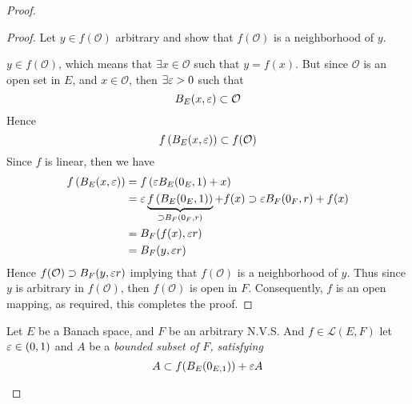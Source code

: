 \begin{proof}
\begin{proof}
Let $y \in  f (\mathcal{O} )  $  arbitrary and show that 
$f(\mathcal{O} )  $  is a neighborhood of $y $.

$y \in  f ( \mathcal{O} )  $, which means that 
$\exists x \in  \mathcal{O}  $  such that 
$y = f(x)  $. But since $\mathcal{O}  $  is an open set in 
$E $, and $x \in  \mathcal{O}  $, then $\exists  \varepsilon  > 0 $  such that 
\[
B_{E}(x, \varepsilon )  \subset  \mathcal{O} 
\]
Hence 
\[
f \left( B_{E}(x, \varepsilon )  \right) \subset  f(\mathcal{O} ) 
\]
Since $f $ is linear, then we have 
\begin{align*}
	f \left( B_{E}(x, \varepsilon )  \right) &= 
f \left( \varepsilon B_{E}(0_{E}, 1) +  x \right) \\
					   &= 
					   \varepsilon  
					   \underbrace{
		f \left( B_{E}(0_{E},1)  \right) 
					   }_{ \supset B_{F}(0_{F}, r) }  + f(x) 
					   \supset  \varepsilon 
					   B_{F}(0_{F}, r)  + 
					   f(x) 
					   \\
					   &= 
					   B_{F}(f(x), \varepsilon r )  \\
					   &= 
					   B_{F}(y, \varepsilon  r) 
\end{align*}
Hence $f(\mathcal{O} ) \supset B_{F}(y, \varepsilon  r)  $ implying that 
$f(\mathcal{O} )  $  is a neighborhood of $y $. 
Thus since $y $ is arbitrary in $f(\mathcal{O} )  $, then 
$f(\mathcal{O} )  $ is open in $F $. Consequently, 
$f $ is an open mapping, as required, this completes the proof.
\end{proof}             
\begin{theorem}[]
Let $E $ be a Banach space, and $F $ be an arbitrary 
N.V.S. And $f \in  \mathcal{L} (E, F)  $  let 
$\varepsilon  \in  (0,1)  $  and $A $ be a \it bounded \normalfont 
subset of $F $, satisfying 
\[
A \subset f (B_{E}(0_{E, 1}) )  + \varepsilon A
\]


\end{theorem}
\end{proof}
